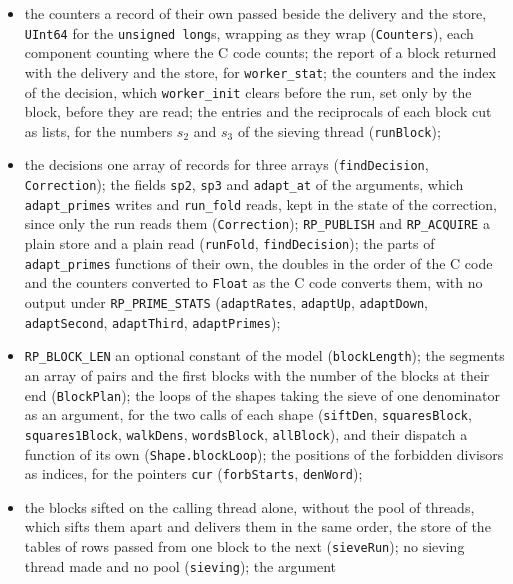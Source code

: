 \begin{itemize}
    code normalizes the arguments in place and restores them (\verb|SieveOptions|,
    \verb|SieveOptions.normalize|);
  \item the counters a record of their own passed beside the delivery and the store, \verb|UInt64|
    for the \verb|unsigned long|s, wrapping as they wrap (\verb|Counters|), each component counting
    where the C code counts; the report of a block returned with the delivery and the store, for
    \verb|worker_stat|; the counters and the index of the decision, which \verb|worker_init| clears
    before the run, set only by the block, before they are read; the entries and the reciprocals of
    each block cut as lists, for the numbers $s_2$ and $s_3$ of the sieving thread
    (\verb|runBlock|);
  \item the decisions one array of records for three arrays (\verb|findDecision|,
    \verb|Correction|); the fields \verb|sp2|, \verb|sp3| and \verb|adapt_at| of the arguments,
    which \verb|adapt_primes| writes and \verb|run_fold| reads, kept in the state of the correction,
    since only the run reads them (\verb|Correction|); \verb|RP_PUBLISH| and \verb|RP_ACQUIRE| a
    plain store and a plain read (\verb|runFold|, \verb|findDecision|); the parts of
    \verb|adapt_primes| functions of their own, the doubles in the order of the C code and the
    counters converted to \verb|Float| as the C code converts them, with no output under
    \verb|RP_PRIME_STATS| (\verb|adaptRates|, \verb|adaptUp|, \verb|adaptDown|, \verb|adaptSecond|,
    \verb|adaptThird|, \verb|adaptPrimes|);
  \item \verb|RP_BLOCK_LEN| an optional constant of the model (\verb|blockLength|); the segments an
    array of pairs and the first blocks with the number of the blocks at their end
    (\verb|BlockPlan|); the loops of the shapes taking the sieve of one denominator as an argument,
    for the two calls of each shape (\verb|siftDen|, \verb|squaresBlock|, \verb|squares1Block|,
    \verb|walkDens|, \verb|wordsBlock|, \verb|allBlock|), and their dispatch a function of its own
    (\verb|Shape.blockLoop|); the positions of the forbidden divisors as indices, for the pointers
    \verb|cur| (\verb|forbStarts|, \verb|denWord|);
  \item the blocks sifted on the calling thread alone, without the pool of threads, which sifts them
    apart and delivers them in the same order, the store of the tables of rows passed from one block
    to the next (\verb|sieveRun|); no sieving thread made and no pool (\verb|sieving|); the argument

\end{itemize}
